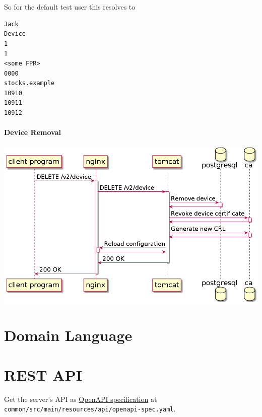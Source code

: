 \documentclass{memoir}
\begin{document}
So for the default test user this resolves to

\begin{lstlisting}
Jack
Device
1
1
<some FPR>
0000
stocks.example
10910
10911
10912
\end{lstlisting}

\paragraph{Device Removal\\}

\includegraphics[width=\linewidth]{diagrams/remove-device.png}

\section{Domain Language}

\section{REST API}

Get the server's API as \href{https://spec.openapis.org/oas/latest.html}{OpenAPI specification} at \texttt{common/src/main/resources/api/openapi-spec.yaml}.

\backmatter
\end{document}
